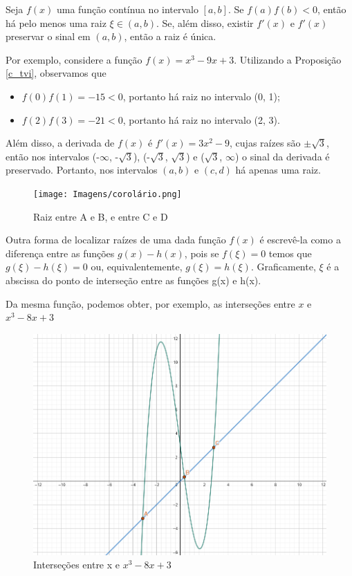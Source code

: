 \begin{prop}\label{c_tvi}%
Seja $f(x)$ uma função contínua no intervalo $[a, b]$. Se $f(a)f(b) < 0$, então há pelo menos uma raiz $\xi \in (a,b)$. Se, além disso, existir $f'(x)$ e $f'(x)$ preservar o sinal em $(a,b)$, então a raiz é única.
\end{prop} %
Por exemplo, considere a função $f(x) = x^3 - 9x + 3$. Utilizando a Proposição \ref{c_tvi}, observamos que
\begin{itemize}
    \item $f(0)f(1) = -15 < 0$, portanto há raiz no intervalo (0, 1);
    \item $f(2)f(3) = -21 < 0$, portanto há raiz no intervalo (2, 3).
\end{itemize}
Além disso, a derivada de $f(x)$ é $f'(x) = 3x^2 - 9$, cujas raízes são $\pm \sqrt{3}$, então nos intervalos (-$\infty$, -$\sqrt{3}$), (-$\sqrt{3}$, $\sqrt{3}$) e ($\sqrt{3}$, $\infty$) o sinal da derivada é preservado. Portanto, nos intervalos $(a,b)$ e $(c,d)$ há apenas uma raiz.

\begin{figure}[h]
    \centering
    \texttt{[image: Imagens/corolário.png]}
    \caption{Raiz entre A e B, e entre C e D}
    \label{fig:coro}
\end{figure}

\newpage

Outra forma de localizar raízes de uma dada função $f(x)$ é escrevê-la como a diferença entre as funções $g(x)-h(x)$, pois se $f(\xi) = 0$ temos que $g(\xi) - h(\xi) = 0$ ou, equivalentemente, $g(\xi) = h(\xi)$. Graficamente, $\xi$ é a abscissa do ponto de interseção entre as funções g(x) e h(x).

Da mesma função, podemos obter, por exemplo, as interseções entre $x$ e $x^3 - 8x + 3$
\begin{figure}[h]
    \centering
    \includegraphics[height = 0.5\textwidth]{Imagens/interseções.png}
    \caption{Interseções entre x e $x^3 - 8x + 3$}
    \label{fig:inters}
\end{figure}

